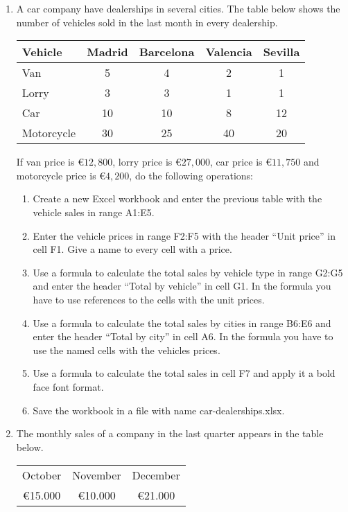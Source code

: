\begin{enumerate}[leftmargin=*,resume]
\item \label{ex-car-dealerships}A car company have dealerships in several cities. The table below shows the number of
vehicles sold in the last month in every dealership. 
\begin{center}
\begin{tabular}{lcccc}
\toprule
Vehicle & Madrid & Barcelona & Valencia & Sevilla\\
\midrule
Van & 5 & 4 & 2 & 1\\
Lorry & 3 & 3 & 1 & 1\\
Car & 10 & 10 & 8 & 12\\
Motorcycle & 30 & 25 & 40 & 20\\
\bottomrule
\end{tabular}
\end{center}

If van price is €$12,800$, lorry price is €$27,000$, car price is €$11,750$ and motorcycle price is €$4,200$, do the following
operations:
\begin{enumerate}
\item Create a new Excel workbook and enter the previous table with the vehicle sales in range A1:E5.
\item Enter the vehicle prices in range F2:F5 with the header ``Unit price'' in cell F1.
Give a name to every cell with a price. 
\item Use a formula to calculate the total sales by vehicle type in range G2:G5 and enter the header ``Total by vehicle'' in cell
G1. In the formula you have to use references to the cells with the unit prices. 
\item Use a formula to calculate the total sales by cities in range B6:E6 and enter the header ``Total by city'' in cell A6.
In the formula you have to use the named cells with the vehicles prices. 
\item Use a formula to calculate the total sales in cell F7 and apply it a bold face font format. 
\item Save the workbook in a file with name \textsf{car-dealerships.xlsx}. 
\end{enumerate}


\item The monthly sales of a company in the last quarter appears in the table below. 
\begin{center}
\begin{tabular}{ccc}
\toprule
October & November & December\\
€15.000 & €10.000 & €21.000\\
\bottomrule
\end{tabular}
\end{center}


\end{enumerate}
